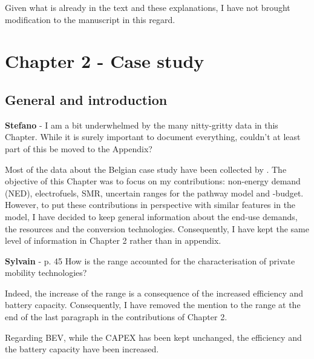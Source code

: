 \documentclass[12pt,a4paper]{article}
\begin{document}
Given what is already in the text and these explanations, I have not brought modification to the manuscript in this regard.

\section{Chapter 2 - Case study}
\label{case_study}

\subsection{General and introduction}
\label{methodo_general}

\begin{mdframed}[style=comment] %
{\color{orange} \textbf{Stefano}} - I am a bit underwhelmed by the many nitty-gritty data in this Chapter. While it is surely important to document everything, couldn’t at least part of this be moved to the Appendix?
\end{mdframed}

\noindent Most of the data about the Belgian case study have been collected by \citet{limpens2021generating}. The objective of this Chapter was to focus on my contributions: non-energy demand (NED), electrofuels, SMR, uncertain ranges for the pathway model and -budget. However, to put these contributions in perspective with similar features in the model, I have decided to keep general information about the end-use demands, the resources and the conversion technologies. Consequently, I have kept the same level of information in Chapter 2 rather than in appendix.

\begin{mdframed}[style=comment] %
{\color{purple} \textbf{Sylvain}} - p. 45 How is the range accounted for the characterisation of private mobility technologies?
\end{mdframed}

\noindent Indeed, the increase of the range is a consequence of the increased efficiency and battery capacity. Consequently, I have removed the mention to the range {\color{blue}at the end of the last paragraph in the contributions of Chapter 2}.

\begin{mdframed}[style=manuscript] %
Regarding BEV, while the CAPEX has been kept unchanged, the efficiency and the battery capacity have been increased. 
\end{mdframed}
\end{document}
